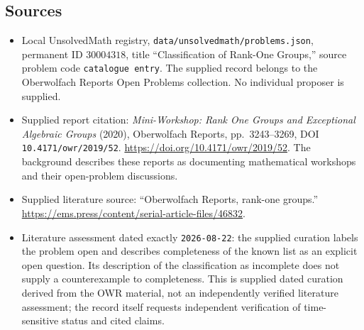 \documentclass[11pt]{article}
\begin{document}
\subsection{Sources}
\begin{itemize}
\item Local UnsolvedMath registry, \texttt{data/unsolvedmath/problems.json}, permanent ID \(30004318\), title ``Classification of Rank-One Groups,'' source problem code \texttt{catalogue entry}. The supplied record belongs to the Oberwolfach Reports Open Problems collection. No individual proposer is supplied.
\item Supplied report citation: \emph{Mini-Workshop: Rank One Groups and Exceptional Algebraic Groups} (2020), Oberwolfach Reports, pp.\ 3243--3269, DOI \texttt{10.4171/owr/2019/52}. \url{https://doi.org/10.4171/owr/2019/52}. The background describes these reports as documenting mathematical workshops and their open-problem discussions.
\item Supplied literature source: ``Oberwolfach Reports, rank-one groups.'' \url{https://ems.press/content/serial-article-files/46832}.
\item Literature assessment dated exactly \texttt{2026-08-22}: the supplied curation labels the problem open and describes completeness of the known list as an explicit open question. Its description of the classification as incomplete does not supply a counterexample to completeness. This is supplied dated curation derived from the OWR material, not an independently verified literature assessment; the record itself requests independent verification of time-sensitive status and cited claims.
\end{itemize}
\end{document}

